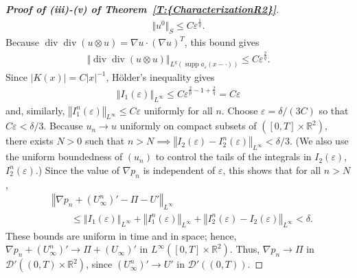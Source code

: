 \documentclass[reqno,openright,11pt,twoside]{amsart}
\theoremstyle{definition}
\numberwithin{equation}{section}
\begin{document}
\begin{proof}[\textbf{Proof of {\textit{({iii})}}-{\textit{({v})}} of {Theorem~\ref{T:{CharacterizationR2}}}}]
\begin{align*}
		{\ensuremath{\Vert {u^0} \Vert}}_S
		\le C {\ensuremath{\varepsilon}}^{\frac{1}{q}}.
\end{align*}
Because $\operatorname{div} \operatorname{div} (u \otimes u) = {\ensuremath{\nabla}} u \cdot ({\ensuremath{\nabla}} u)^T$, this bound gives
\begin{align*}
	{\ensuremath{\left\Vert {\operatorname{div} \operatorname{div} (u \otimes u)} \right\Vert}}_{L^q(\operatorname{supp} a_{\ensuremath{\varepsilon}}(x - \cdot))}
		\le C {\ensuremath{\varepsilon}}^{\frac{2}{q}}.
		
		
\end{align*}
Since ${\left\vert{K(x)}\right\vert} = C {\left\vert{x}\right\vert}^{-1}$, {H\"{o}lder's } inequality gives
\begin{align*}
    {\ensuremath{\left\Vert {I_1({\ensuremath{\varepsilon}})} \right\Vert}}_{L^{\ensuremath{\infty}}}
        \le C {\ensuremath{\varepsilon}}^{\frac{2}{p} - 1 + \frac{2}{q}}
        = C {\ensuremath{\varepsilon}}
\end{align*}
and, similarly, ${\ensuremath{\left\Vert {I_1^n({\ensuremath{\varepsilon}})} \right\Vert}}_{L^{\ensuremath{\infty}}} \le C {\ensuremath{\varepsilon}}$ uniformly for all $n$.  Choose ${\ensuremath{\varepsilon}} = \delta/(3 C)$ so that $C {\ensuremath{\varepsilon}} < \delta/3$. Because $u_n \to u$ uniformly on compact subsets of $([0, T] \times {\ensuremath{{\ensuremath{\mathbb{{R}}}}}}^2)$, there exists $N > 0$ such that $n > N \implies {\ensuremath{\left\Vert {I_2({\ensuremath{\varepsilon}}) - I_2^n({\ensuremath{\varepsilon}})} \right\Vert}}_{L^{\ensuremath{\infty}}} < \delta/3$. (We also use the uniform boundedness of $(u_n)$ to control the tails of the integrals in $I_2({\ensuremath{\varepsilon}})$, $I_2^n({\ensuremath{\varepsilon}})$.) Since the value of ${\ensuremath{\nabla}} p_n$ is independent of ${\ensuremath{\varepsilon}}$, this shows that for all $n > N$,
\begin{align*}
	&{\ensuremath{\left\Vert {{\ensuremath{\nabla}} p_n + (U_{\ensuremath{\infty}}^n)' - \Pi - U'} \right\Vert}}_{L^{\ensuremath{\infty}}} \\
	    &\qquad
		\le
		 {\ensuremath{\left\Vert {I_1({\ensuremath{\varepsilon}})} \right\Vert}}_{L^{\ensuremath{\infty}}} + {\ensuremath{\left\Vert {I_1^n({\ensuremath{\varepsilon}})} \right\Vert}}_{L^{\ensuremath{\infty}}}
			+ {\ensuremath{\left\Vert {I_2^n({\ensuremath{\varepsilon}}) - I_2({\ensuremath{\varepsilon}})} \right\Vert}}_{L^{\ensuremath{\infty}}}
		< \delta.
\end{align*}
These bounds are uniform in time and in space; hence, ${\ensuremath{\nabla}} p_n + (U_{\ensuremath{\infty}}^n)' \to \Pi + (U_{\ensuremath{\infty}})'$ in $L^{\ensuremath{\infty}}([0, T] \times {\ensuremath{{\ensuremath{\mathbb{{R}}}}}}^2)$. Thus, ${\ensuremath{\nabla}} p_n \to \Pi$ in ${\ensuremath{\mathcal{{D}}}}'((0, T) \times {\ensuremath{{\ensuremath{\mathbb{{R}}}}}}^2)$, since $(U_{\ensuremath{\infty}}^n)' \to U'$ in ${\ensuremath{\mathcal{{D}}}}'((0, T))$.


\end{proof}
\end{document}
